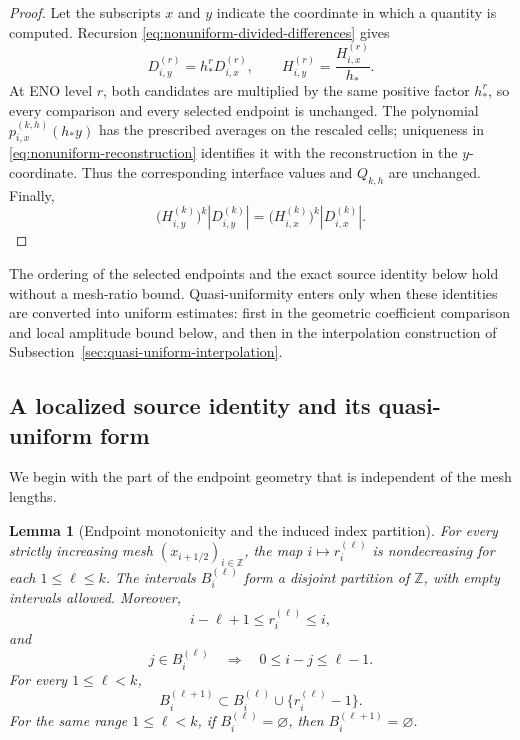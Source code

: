 \documentclass[11pt]{amsart}
\theoremstyle{plain}
\newtheorem{lemma}[theorem]{Lemma}
\theoremstyle{definition}
\theoremstyle{remark}
\numberwithin{equation}{section}
\theoremstyle{plain}
\begin{document}
\begin{proof}
	Let the subscripts $x$ and $y$ indicate the coordinate in which a quantity
	is computed.  Recursion \eqref{eq:nonuniform-divided-differences} gives
	\[
	D_{i,y}^{(r)}=h_*^rD_{i,x}^{(r)},
	\qquad
	H_{i,y}^{(r)}=\frac{H_{i,x}^{(r)}}{h_*}.
	\]
	At ENO level $r$, both candidates are multiplied by the same positive
	factor $h_*^r$, so every comparison and every selected endpoint is
	unchanged.  The polynomial $p_{i,x}^{(k,h)}(h_*y)$ has the prescribed
	averages on the rescaled cells; uniqueness in
	\eqref{eq:nonuniform-reconstruction} identifies it with the reconstruction
	in the $y$-coordinate.  Thus the corresponding interface values and
	$Q_{k,h}$ are unchanged.  Finally,
	\[
	\bigl(H_{i,y}^{(k)}\bigr)^k|D_{i,y}^{(k)}|
	=
	\bigl(H_{i,x}^{(k)}\bigr)^k|D_{i,x}^{(k)}|.
	\]
\end{proof}

The ordering of the selected endpoints and the exact source identity
below hold without a mesh-ratio bound.  Quasi-uniformity enters only when
these identities are converted into uniform estimates: first in the geometric
coefficient comparison and local amplitude bound below, and then in the
interpolation construction of
Subsection~\ref{sec:quasi-uniform-interpolation}.

\subsection{A localized source identity and its quasi-uniform form}
\label{sec:nonuniform-localized-source}

We begin with the part of the endpoint geometry that is independent of the
mesh lengths.

\begin{lemma}[Endpoint monotonicity and the induced index partition]
	\label{lem:nonuniform-endpoint-partition}
	For every strictly increasing mesh $(x_{i+1/2})_{i\in\mathbb Z}$, the map $i\mapsto r_i^{(\ell)}$ is nondecreasing for
	each $1\le\ell\le k$.  The intervals $B_i^{(\ell)}$ form a disjoint
	partition of $\mathbb Z$, with empty intervals allowed.  Moreover,
	\begin{equation}\label{eq:nonuniform-endpoint-bounds}
		i-\ell+1\le r_i^{(\ell)}\le i,
	\end{equation}
	and
	\begin{equation}\label{eq:nonuniform-interval-locality}
		j\in B_i^{(\ell)}
		\quad\Longrightarrow\quad
		0\le i-j\le\ell-1.
	\end{equation}
	For every $1\le\ell<k$,
	\begin{equation}\label{eq:nonuniform-interval-nesting}
		B_i^{(\ell+1)}
		\subset
		B_i^{(\ell)}\cup\{r_i^{(\ell)}-1\}.
	\end{equation}
	For the same range $1\le\ell<k$, if
	$B_i^{(\ell)}=\varnothing$, then
	$B_i^{(\ell+1)}=\varnothing$.
\end{lemma}
\end{document}
